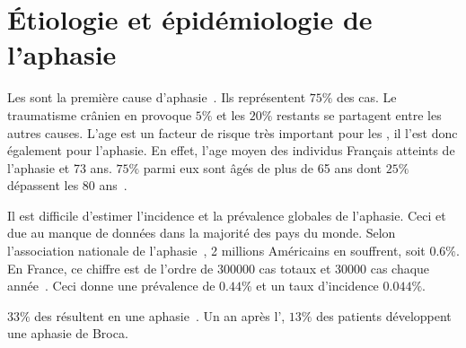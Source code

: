 \section{Étiologie et épidémiologie de l'aphasie}

Les  sont la première cause d'aphasie~\cite{Hallowell_2017}. 
Ils représentent \(75\%\) des cas.
Le traumatisme crânien en provoque \(5\%\) 
et les \(20\%\) restants se partagent entre les autres causes.
L'age est un facteur de risque très important pour les ,
il l'est donc également pour l'aphasie. 
En effet, l'age moyen des individus Français atteints de l'aphasie et 73 ans.
\(75\%\) parmi eux sont âgés de plus de 65 ans dont \(25\%\) dépassent les 80 ans~\cite{press}.

Il est difficile d'estimer l'incidence et la prévalence globales de l'aphasie.
Ceci et due au manque de données dans la majorité des pays du monde.
Selon l'association nationale de l'aphasie~\cite{Home}, 2 millions Américains en souffrent, soit \(0.6\%\).
En France, ce chiffre est de l'ordre de 300000 cas totaux et 30000 cas chaque année~\cite{press}.
Ceci donne une prévalence de \(0.44\%\) et un taux d'incidence \(0.044\%\).

\(33\%\) des  résultent en une aphasie~\cite{press}.
Un an après l', \(13\%\) des patients développent une aphasie de Broca.
